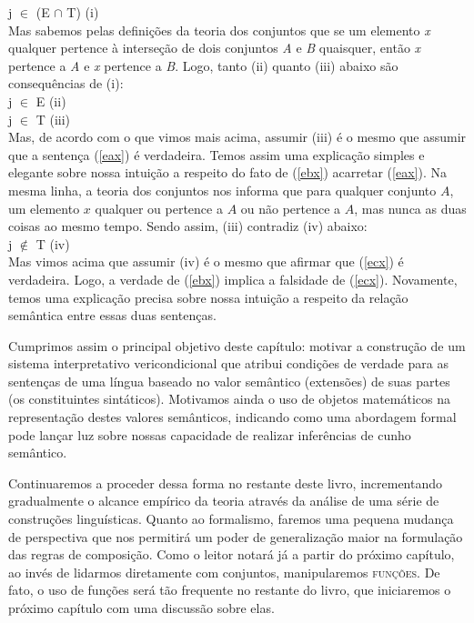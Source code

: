 \n j $\in$ (E $\cap$ T) \hfill (i)\\

\n Mas sabemos pelas defini\-çõ\-es da teoria dos conjuntos que se
um elemento \textit{x} qualquer pertence à interse\-ção de dois
conjuntos \textit{A} e \textit{B} quaisquer, então \textit{x}
pertence a \textit{A} e \textit{x} pertence a \textit{B}. Logo,
tanto (ii) quanto (iii) abaixo são consequências de (i):\\

\n j $\in$ E \hfill (ii)\\

\n j $\in$ T \hfill (iii)\\

\n Mas, de acordo com o que vimos mais acima, assumir (iii) é o
mesmo que assumir que a sentença (\ref{eax}) é verdadeira. Temos
assim uma explica\-ção simples e elegante sobre nossa intui\-ção a
respeito do fato de (\ref{ebx}) acarretar (\ref{eax}). Na mesma
linha, a teoria dos conjuntos nos informa que para qualquer
conjunto $A$, um elemento $x$ qualquer ou pertence a
$A$ ou não pertence a $A$, mas nunca as duas coisas
ao mesmo tempo. Sendo assim, (iii) contradiz
(iv) abaixo:\\

\n j $\not\in$ T \hfill (iv)\\

\n Mas vimos acima que assumir (iv) é o mesmo que afirmar que
(\ref{ecx}) é verdadeira. Logo, a verdade de (\ref{ebx}) implica a
falsidade de (\ref{ecx}). Novamente, temos uma explica\-ção precisa
sobre nossa intui\-ção a respeito da rela\-ção semântica entre
essas duas sen\-ten\-ças.

Cumprimos assim o principal objetivo deste capítulo: motivar a
constru\-ção de um sistema interpretativo vericondicional que atribui
condi\-çõ\-es de verdade para as sen\-ten\-ças de uma língua
baseado no valor semântico (extensões) de suas partes (os
constituintes sintáticos). Motivamos ainda o uso de objetos
matemáticos na representa\-ção destes valores semânticos,
indicando como uma abordagem formal pode lançar luz sobre nossas
capacidade de realizar inferências de cunho semântico.

Continuaremos a proceder dessa forma no restante deste livro,
incrementando gradualmente o alcance empírico da teoria através da
análise de uma série de constru\-çõ\-es linguísticas. Quanto ao
formalismo, faremos uma pequena mudança de perspectiva que nos
permitirá um poder de generaliza\-ção maior na formula\-ção das
regras de composi\-ção. Como o leitor notará já a partir do
próximo capítulo, ao invés de lidarmos diretamente com conjuntos,
manipularemos \textsc{fun\-çõ\-es}. De fato, o uso de fun\-çõ\-es
será tão frequente no restante do livro, que iniciaremos o próximo capítulo com uma discussão sobre elas.


